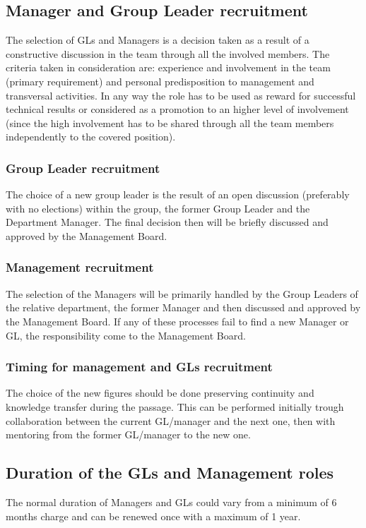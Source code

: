 \documentclass[graybox]{svmult}
\begin{document}
\subsection{Manager and Group Leader recruitment}
The selection of GLs and Managers is a decision taken as a result of a constructive discussion in the team through all the involved members. The criteria taken in consideration are: experience and involvement in the team (primary requirement) and personal predisposition to management and transversal activities. In any way the role has to be used as reward for successful technical results or considered as a promotion to an higher level of involvement (since the high involvement has to be shared through all the team members independently to the covered position).

\subsubsection{Group Leader recruitment}
The choice of a new group leader is the result of an open discussion (preferably with no elections) within the group, the former Group Leader and the Department Manager. The final decision then will be briefly discussed and approved by the Management Board.

\subsubsection{Management recruitment}
The selection of the Managers will be primarily handled by the Group Leaders of the relative department, the former Manager and then discussed and approved by the Management Board.
If any of these processes fail to find a new Manager or GL, the responsibility come to the Management Board.

\subsubsection{Timing for management and GLs recruitment}
The choice of the new figures should be done preserving continuity and knowledge transfer during the passage. This can be performed initially trough collaboration between the current GL/manager and the next one, then with mentoring from the former GL/manager to the new one.

\subsection{Duration of the GLs and Management roles}
The normal duration of Managers and GLs could vary from a minimum of 6 months charge and can be renewed once with a maximum of 1 year.
\end{document}

